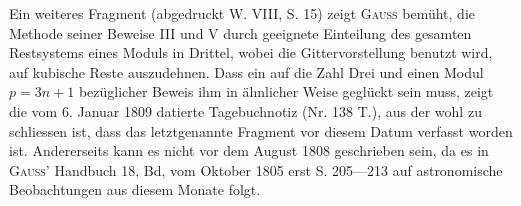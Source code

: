 Ein weiteres Fragment (abgedruckt W. VIII, S. 15) zeigt \textsc{Gauss} bemüht, die Methode seiner Beweise III und V durch geeignete Einteilung des gesamten Restsystems eines Moduls in Drittel, wobei die Gittervorstellung benutzt wird, auf kubische Reste auszudehnen. Dass ein auf die Zahl Drei und einen Modul \(p=3n+1\) bezüglicher Beweis ihm in ähnlicher Weise geglückt sein muss, zeigt die vom 6. Januar 1809 datierte Tagebuchnotiz (Nr. 138 T.), aus der wohl zu schliessen ist, dass das letztgenannte Fragment vor diesem Datum verfasst worden ist. Andererseits kann es nicht vor dem August 1808 geschrieben sein, da es in \textsc{Gauss}’ Handbuch 18, Bd, vom Oktober 1805 erst S. 205—213 auf astronomische Beobachtungen aus diesem Monate folgt.
